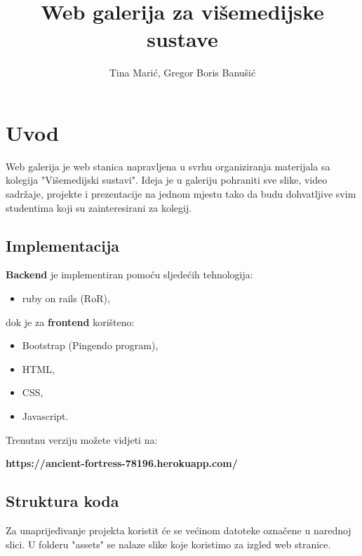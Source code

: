 \documentclass[]{article}
\title{Web galerija za višemedijske sustave}
\author{Tina Marić, Gregor Boris Banušić}
\begin{document}
\maketitle


\section{Uvod}
Web galerija je web stanica napravljena u svrhu organiziranja materijala sa kolegija "Višemedijski sustavi".
Ideja je u galeriju pohraniti sve slike, video sadržaje, projekte i prezentacije na jednom mjestu tako da budu dohvatljive svim studentima koji su zainteresirani za kolegij.
\newline
\newline
\subsection{Implementacija}
\textbf{Backend} je implementiran pomoću sljedećih tehnologija:
\begin{itemize}
	\item ruby on rails (RoR),
\end{itemize}
dok je za \textbf{frontend} korišteno:
\begin{itemize}
	\item Bootstrap (Pingendo program),
	\item HTML,
	\item CSS,
	\item Javascript.
\end{itemize}

Trenutnu verziju možete vidjeti na:

\textbf{https://ancient-fortress-78196.herokuapp.com/}

\newpage

\subsection{Struktura koda}
Za unaprijeđivanje projekta koristit će se većinom datoteke označene u narednoj slici. U folderu "assets" se nalaze slike koje koristimo za izgled web stranice.
\end{document}
